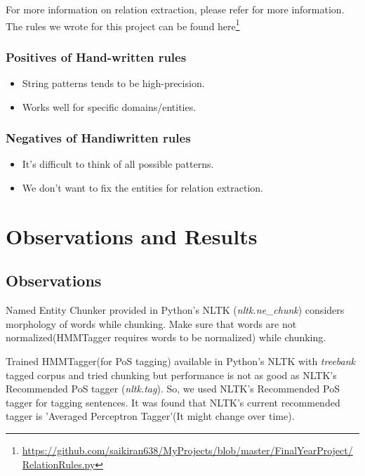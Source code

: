 \documentclass[12pt]{report}
\begin{document}
\par For more information on relation extraction, please refer \cite{BookIE} for more information.
The rules we wrote for this project can be found here\footnote{\url{https://github.com/saikiran638/MyProjects/blob/master/FinalYearProject/RelationRules.py}}
\subsection{Positives of Hand-written rules}
\begin{itemize}
\item String patterns tends to be  high-precision.
\item Works well for specific domains/entities.
\end{itemize}

\subsection{Negatives of Handiwritten rules}
\begin{itemize}
\item It's difficult to think of all possible patterns.
\item We don't want to fix the entities for relation extraction.
\end{itemize}

\chapter{Observations and Results}
\section{Observations}
\par Named Entity Chunker provided in Python's NLTK (\textit{nltk.ne\_chunk}) considers morphology of 
words while chunking. Make sure that words are not normalized(HMMTagger requires words to 
be normalized) while chunking.
\par Trained HMMTagger(for PoS tagging) available in Python's NLTK with \textit{treebank} tagged corpus and
 tried chunking but performance is not as good as NLTK's Recommended PoS tagger (\textit{nltk.tag}).
 So, we used NLTK's Recommended PoS tagger for tagging sentences. It was found that NLTK's
  current recommended tagger is 'Averaged Perceptron Tagger'(It might change over time).
 
\end{document}
